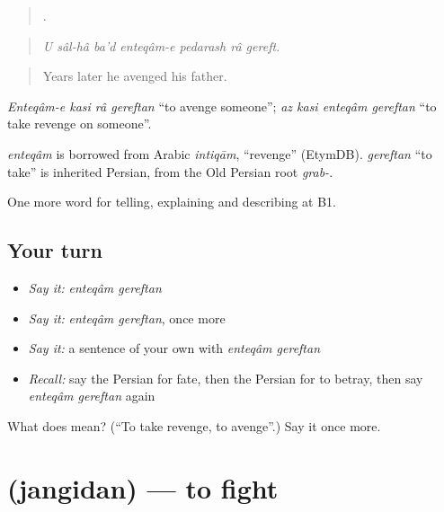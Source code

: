 \begin{quote}
       .
\end{quote}

\begin{quote}
\emph{U sâl-hâ ba'd enteqâm-e pedarash râ gereft.}
\end{quote}

\begin{quote}
Years later he avenged his father.
\end{quote}

\emph{Enteqâm-e kasi râ gereftan} \textquotedblleft{}to avenge someone\textquotedblright{}; \emph{az kasi enteqâm gereftan} \textquotedblleft{}to take revenge on someone\textquotedblright{}.

\begin{cousinweb}
\emph{enteqâm} is borrowed from Arabic \emph{intiqām}, \textquotedblleft{}revenge\textquotedblright{} (EtymDB). \emph{gereftan} \textquotedblleft{}to take\textquotedblright{} is inherited Persian, from the Old Persian root \emph{grab-}.
\end{cousinweb}

\begin{grammarlens}[title={What you've built}]
One more word for telling, explaining and describing at B1.
\end{grammarlens}

\subsection*{Your turn}
\begin{itemize}
\raggedright
  \item \emph{Say it:} \emph{enteqâm gereftan}
  \item \emph{Say it:} \emph{enteqâm gereftan}, once more
  \item \emph{Say it:} a sentence of your own with \emph{enteqâm gereftan}
  \item \emph{Recall:} say the Persian for fate, then the Persian for to betray, then say \emph{enteqâm gereftan} again
\end{itemize}

\begin{tcolorbox}[breakable,colback=teal!4,colframe=teal!35!black,title={Before you move on}]
What does   mean? (\textquotedblleft{}To take revenge, to avenge\textquotedblright{}.) Say it once more.
\end{tcolorbox}
\section[\texorpdfstring{\fa{جنگیدن} (jangidan)}{جنگیدن (jangidan)}]{ (jangidan) — to fight}

